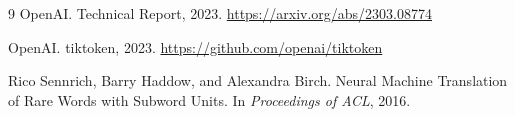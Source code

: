 \documentclass{article}
\begin{document}
\begin{thebibliography}{9}
OpenAI.
 Technical Report, 2023.
\newblock \url{https://arxiv.org/abs/2303.08774}

OpenAI.
\newblock tiktoken, 2023.
\newblock \url{https://github.com/openai/tiktoken}

Rico Sennrich, Barry Haddow, and Alexandra Birch.
\newblock Neural Machine Translation of Rare Words with Subword Units.
\newblock In \textit{Proceedings of ACL}, 2016.
\end{thebibliography}

{
  
  \restoregeometry
}
\end{document}
